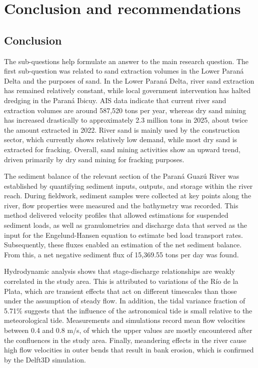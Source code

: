 \chapter{Conclusion and recommendations}
\label{chapter:conclusion}
\section{Conclusion}
The sub-questions help formulate an answer to the main research question. The first sub-question was related to sand extraction volumes in the Lower Paraná Delta and the purposes of sand. In the Lower Paraná Delta, river sand extraction has remained relatively constant, while local government intervention has halted dredging in the Paraná Ibicuy. AIS data indicate that current river sand extraction volumes are around 587,520 tons per year, whereas dry sand mining has increased drastically to approximately 2.3 million tons in 2025, about twice the amount extracted in 2022. River sand is mainly used by the construction sector, which currently shows relatively low demand, while most dry sand is extracted for fracking. Overall, sand mining activities show an upward trend, driven primarily by dry sand mining for fracking purposes.

The sediment balance of the relevant section of the Paraná Guazú River was established by quantifying sediment inputs, outputs, and storage within the river reach. During fieldwork, sediment samples were collected at key points along the river, flow properties were measured and the bathymetry was recorded. This method delivered velocity profiles that allowed estimations for suspended sediment loads, as well as granulometries and discharge data that served as the input for the Engelund-Hansen equation to estimate bed load transport rates. Subsequently, these fluxes enabled an estimation of the net sediment balance. From this, a net negative sediment flux of 15,369.55 tons per day was found.


Hydrodynamic analysis shows that stage-discharge relationships are weakly correlated in the study area. This is attributed to variations of the Río de la Plata, which are transient effects that act on different timescales than those under the assumption of steady flow. In addition, the tidal variance fraction of 5.71\% suggests that the influence of the astronomical tide is small relative to the meteorological tide. Measurements and simulations record mean flow velocities between 0.4 and 0.8 m/s, of which the upper values are mostly encountered after the confluences in the study area. Finally, meandering effects in the river cause high flow velocities in outer bends that result in bank erosion, which is confirmed by the Delft3D simulation. 
 
